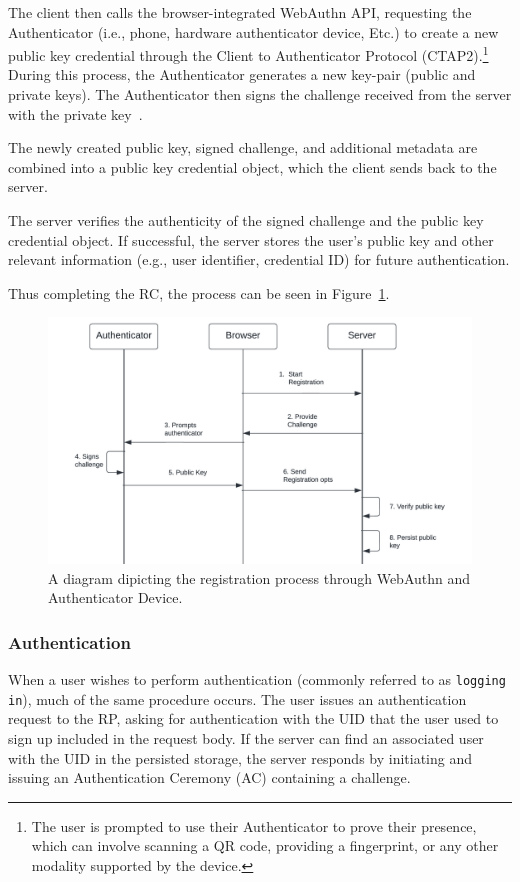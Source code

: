 The client then calls the browser-integrated WebAuthn API, requesting the
Authenticator (i.e., phone, hardware authenticator device, Etc.)
to create a new public key credential through the Client to Authenticator
Protocol (CTAP2).\footnote{
  The user is prompted to use their Authenticator to prove their presence, which can involve scanning a QR code,
  providing a fingerprint, or any other modality supported by the device.}
During this process, the Authenticator generates a new key-pair (public and
private keys).
The Authenticator then signs the challenge received from the server with the
private key~\cite{webauthn-2-registering}.

The newly created public key, signed challenge, and additional metadata are
combined into a public key credential object, which the client sends back to
the server.

The server verifies the authenticity of the signed challenge and the public key credential object.
If successful, the server stores the user's public key and other relevant information (e.g., user identifier, credential ID)
for future authentication.

Thus completing the RC, the process can be seen in
Figure~\ref{fig:registration}.
\begin{figure}[htbp]
  \centering
  \includegraphics[width=0.75\linewidth]{images/Registration}
  \caption{\footnotesize A diagram dipicting the registration process through WebAuthn and Authenticator Device.}
  \label{fig:registration}
\end{figure}

\subsubsection{Authentication}\label{subsubsec:authentication}
When a user wishes to perform authentication (commonly referred to as \texttt{logging in}), much of the same procedure
occurs.
The user issues an authentication request to the RP, asking for authentication
with the UID that the user used to sign up included in the request body.
If the server can find an associated user with the UID in the persisted storage,
the server responds by initiating and issuing an Authentication Ceremony (AC)
containing a challenge.

